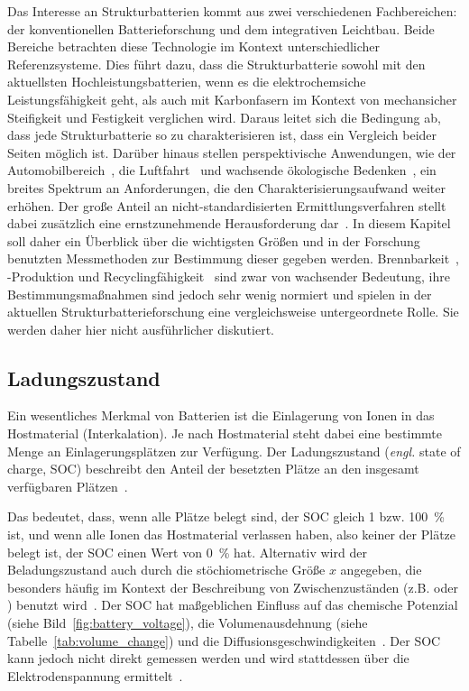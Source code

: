 Das Interesse an Strukturbatterien kommt aus zwei verschiedenen Fachbereichen: der konventionellen Batterieforschung und dem integrativen Leichtbau. Beide Bereiche betrachten diese Technologie im Kontext unterschiedlicher Referenzsysteme. Dies führt dazu, dass die Strukturbatterie sowohl mit den aktuellsten Hochleistungsbatterien, wenn es die elektrochemsiche Leistungsfähigkeit geht, als auch mit Karbonfasern im Kontext von mechansicher Steifigkeit und Festigkeit verglichen wird. Daraus leitet sich die Bedingung ab, dass jede Strukturbatterie so zu charakterisieren ist, dass ein Vergleich beider Seiten möglich ist. Darüber hinaus stellen perspektivische Anwendungen, wie der Automobilbereich~\cite{Martins2021,Pistoia2010}, die Luftfahrt~\cite{Ishfaq2022} und wachsende ökologische Bedenken~\cite{EU2023}, ein breites Spektrum an Anforderungen, die den Charakterisierungsaufwand weiter erhöhen. 
Der große Anteil an nicht-standardisierten Ermittlungsverfahren stellt dabei zusätzlich eine ernstzunehmende Herausforderung dar~\cite{Greenhalgh2023,Zschiebsch2024}. In diesem Kapitel soll daher ein Überblick über die wichtigsten Größen und in der Forschung benutzten Messmethoden zur Bestimmung dieser gegeben werden.
Brennbarkeit~\cite{Shirshova2021,Shirshova2024}, -Produktion und Recyclingfähigkeit~\cite{Heyadati2024} sind zwar von wachsender Bedeutung, ihre Bestimmungsmaßnahmen sind jedoch sehr wenig normiert und spielen in der aktuellen Strukturbatterieforschung eine vergleichsweise untergeordnete Rolle. Sie werden daher hier nicht ausführlicher diskutiert.




\subsection{Ladungszustand}
Ein wesentliches Merkmal von Batterien ist die Einlagerung von Ionen in das Hostmaterial (Interkalation). Je nach Hostmaterial steht dabei eine bestimmte Menge an Einlagerungsplätzen zur Verfügung. Der Ladungszustand (\textit{engl.} state of charge, SOC) beschreibt den Anteil der besetzten Plätze an den insgesamt verfügbaren Plätzen~\cite{Plett2015}.

Das bedeutet, dass, wenn alle Plätze belegt sind, der SOC gleich 1 bzw. 100~\% ist, und wenn alle Ionen das Hostmaterial verlassen haben, also keiner der Plätze belegt ist, der SOC einen Wert von 0~\% hat. Alternativ wird der Beladungszustand auch durch die stöchiometrische Größe $x$ angegeben, die besonders häufig im Kontext der Beschreibung von Zwischenzuständen (z.B.  oder ) benutzt wird~\cite{Newman2021}. Der SOC hat maßgeblichen Einfluss auf das chemische Potenzial (siehe Bild~\ref{fig:battery_voltage}), die Volumenausdehnung (siehe Tabelle~\ref{tab:volume_change}) und die Diffusionsgeschwindigkeiten~\cite{Plett2024}. Der SOC kann jedoch nicht direkt gemessen werden und wird stattdessen über die Elektrodenspannung ermittelt~\cite{Newman2021}.

